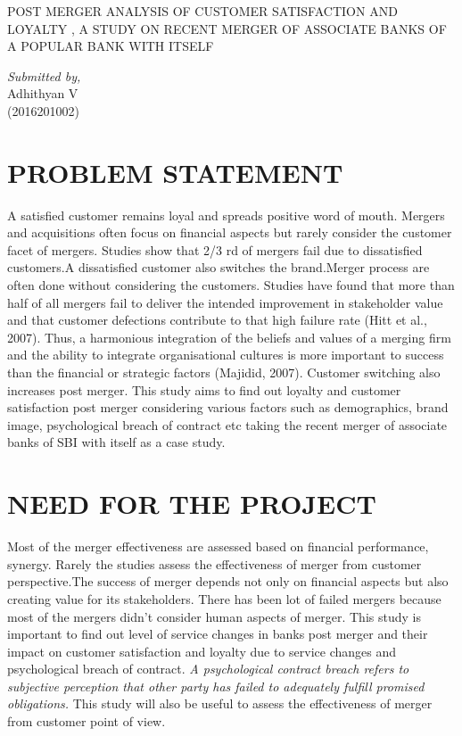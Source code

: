 \documentclass[12pt, a4paper]{article}
\begin{document}
\begin{titlepage}
\begin{center}
\huge{\textsc{POST MERGER ANALYSIS OF CUSTOMER SATISFACTION AND LOYALTY , A STUDY ON RECENT MERGER OF ASSOCIATE BANKS OF A POPULAR BANK WITH ITSELF}}\\
\end{center}
\begin{flushright}
\emph{\large{Submitted by,}}\\
\large{Adhithyan V}\\
\large{(2016201002)}
\end{flushright}
\end{titlepage}

\noindent\makebox[\linewidth]{\rule{\paperwidth}{0.4pt}}
\section*{PROBLEM STATEMENT}
\par A satisfied customer remains loyal and spreads positive word of mouth. Mergers and acquisitions often focus on financial aspects but rarely consider the customer facet of mergers. Studies show that 2/3 rd of mergers fail due to dissatisfied customers.A dissatisfied customer also switches the brand.Merger process are often done without considering the customers. Studies have found that more than half of all mergers fail to deliver the intended improvement in stakeholder value and that customer defections contribute to that high failure rate (Hitt et al., 2007). Thus, a harmonious integration of the beliefs and values of a merging firm and the ability to integrate organisational cultures is more important to success than the financial or strategic factors (Majidid, 2007). Customer switching also increases post merger. This study aims to find out loyalty and customer satisfaction post merger considering various factors such as demographics, brand image, psychological breach of contract etc taking the recent merger of associate banks of SBI with itself as a case study. 

\section*{NEED FOR THE PROJECT}
Most of the merger effectiveness are assessed based on financial performance, synergy. Rarely the studies assess the effectiveness of merger from customer perspective.The success of merger depends not only on financial aspects but also creating value for its stakeholders. There has been lot of failed mergers because most of the mergers didn't consider human aspects of merger.  This study is important to find out level of service changes in banks post merger and their impact on customer satisfaction and loyalty due to service changes and psychological breach of contract. \emph{A psychological contract breach refers to subjective perception that other party has failed to adequately fulfill promised obligations.} This study will also be useful to assess the effectiveness of merger from customer point of view.
\end{document}

